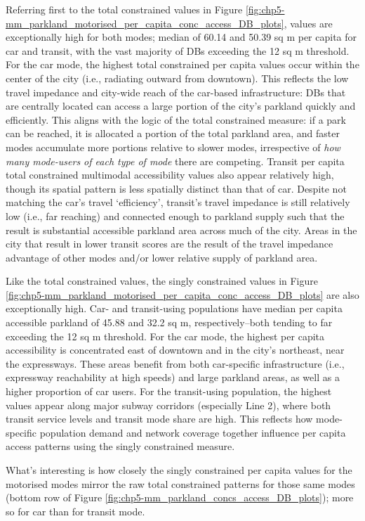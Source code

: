 \documentclass[
11pt, %
oneside, %
english, %
singlespacing, %
]{macthesis} %
\begin{document}
Referring first to the total constrained values in Figure \ref{fig:chp5-mm_parkland_motorised_per_capita_conc_access_DB_plots}, values are exceptionally high for both modes; median of 60.14 and 50.39 sq m per capita for car and transit, with the vast majority of DBs exceeding the 12 sq m threshold. For the car mode, the highest total constrained per capita values occur within the center of the city (i.e., radiating outward from downtown). This reflects the low travel impedance and city-wide reach of the car-based infrastructure: DBs that are centrally located can access a large portion of the city's parkland quickly and efficiently. This aligns with the logic of the total constrained measure: if a park can be reached, it is allocated a portion of the total parkland area, and faster modes accumulate more portions relative to slower modes, irrespective of \emph{how many mode-users of each type of mode} there are competing. Transit per capita total constrained multimodal accessibility values also appear relatively high, though its spatial pattern is less spatially distinct than that of car. Despite not matching the car's travel `efficiency', transit's travel impedance is still relatively low (i.e., far reaching) and connected enough to parkland supply such that the result is substantial accessible parkland area across much of the city. Areas in the city that result in lower transit scores are the result of the travel impedance advantage of other modes and/or lower relative supply of parkland area.

Like the total constrained values, the singly constrained values in Figure \ref{fig:chp5-mm_parkland_motorised_per_capita_conc_access_DB_plots} are also exceptionally high. Car- and transit-using populations have median per capita accessible parkland of 45.88 and 32.2 sq m, respectively--both tending to far exceeding the 12 sq m threshold. For the car mode, the highest per capita accessibility is concentrated east of downtown and in the city's northeast, near the expressways. These areas benefit from both car-specific infrastructure (i.e., expressway reachability at high speeds) and large parkland areas, as well as a higher proportion of car users. For the transit-using population, the highest values appear along major subway corridors (especially Line 2), where both transit service levels and transit mode share are high. This reflects how mode-specific population demand and network coverage together influence per capita access patterns using the singly constrained measure.

What's interesting is how closely the singly constrained per capita values for the motorised modes mirror the raw total constrained patterns for those same modes (bottom row of Figure \ref{fig:chp5-mm_parkland_concs_access_DB_plots}); more so for car than for transit mode.
\end{document}
